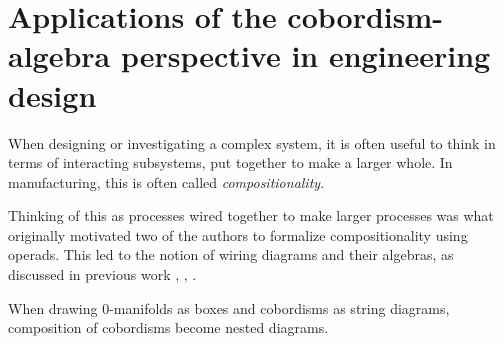 \section[Applications of the cobordism-algebra perspective]{Applications of the cobordism-algebra perspective in engineering design}

When designing or investigating a complex system, it is often useful to think in terms of interacting subsystems, put together to make a larger whole. In manufacturing, this is often called \emph{compositionality}.

Thinking of this as processes wired together to make larger processes was what originally motivated two of the authors to formalize compositionality using operads. This led to the notion of wiring diagrams and their algebras, as discussed in previous work \cite{Spivak}, \cite{Rupel-Spivak}, \cite{Vagner-Spivak-Lerman}. 
 

When drawing 0-manifolds as boxes and cobordisms as string diagrams, composition of cobordisms become nested diagrams.

